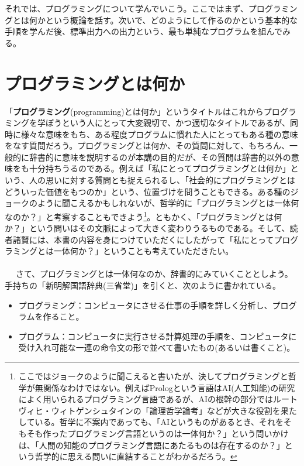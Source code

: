 それでは、プログラミングについて学んでいこう。ここではまず、プログラミングとは何かという概論を話す。次いで、どのようにして作るのかという基本的な手順を学んだ後、標準出力への出力という、最も単純なプログラムを組んでみる。
\section{プログラミングとは何か}
「\textbf{プログラミング}(programming)とは何か」というタイトルはこれからプログラミングを学ぼうという人にとって大変親切で、かつ適切なタイトルであるが、同時に様々な意味をもち、ある程度プログラムに慣れた人にとってもある種の意味をなす質問だろう。プログラミングとは何か、その質問に対して、もちろん、一般的に辞書的に意味を説明するのが本講の目的だが、その質問は辞書的以外の意味をも十分持ちうるのである。例えば「私にとってプログラミングとは何か」という、人の思いに対する質問とも捉えられるし、「社会的にプログラミングとはどういった価値をもつのか」という、位置づけを問うこともできる。ある種のジョークのように聞こえるかもしれないが、哲学的に「プログラミングとは一体何なのか？」と考察することもできよう\footnote{ここではジョークのように聞こえると書いたが、決してプログラミングと哲学が無関係なわけではない。例えばPrologという言語はAI(人工知能)の研究によく用いられるプログラミング言語であるが、AIの根幹の部分ではルートヴィヒ・ウィトゲンシュタインの「論理哲学論考」などが大きな役割を果たしている。哲学に不案内であっても、「AIというものがあるとき、それをそもそも作ったプログラミング言語というのは一体何か？」という問いかけは、「人間の知能のプログラミング言語にあたるものは存在するのか？」という哲学的に思える問いに直結することがわかるだろう。}。ともかく、「プログラミングとは何か？」という問いはその文脈によって大きく変わりうるものである。そして、読者諸賢には、本書の内容を身につけていただくにしたがって「私にとってプログラミングとは一体何か？」ということも考えていただきたい。
\\ \\　
さて、プログラミングとは一体何なのか、辞書的にみていくこととしよう。手持ちの「新明解国語辞典(三省堂)」を引くと、次のように書かれている。
\begin{itemize}
\item プログラミング：コンピュータにさせる仕事の手順を詳しく分析し、プログラムを作ること。
\item プログラム：コンピュータに実行させる計算処理の手順を、コンピュータに受け入れ可能な一連の命令文の形で並べて書いたもの(あるいは書くこと)。
\end{itemize}

